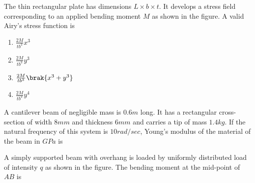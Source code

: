 \item The thin rectangular plate has dimensions $L\times b\times t.$ It develops a stress field corresponding to an applied bending moment $M$ as shown in the figure. A valid Airy's stress function is\\\begin{center}
\end{center}
\begin{enumerate}
	\item $\frac{2M}{tb^3}x^3$
	\item $\frac{2M}{tb^3}y^3$
	\item $\frac{2M}{tb^3}\brak{x^3+y^3}$
	\item $\frac{2M}{tb^3}y^4$
\end{enumerate}
\item A cantilever beam of negligible mass is $0.6 m$ long. It has a rectangular cross-section of width $8 mm$ and thickness $6 mm$ and carries a tip of mass $1.4 kg$. If the natural frequency of this system is $10 rad/sec$, Young's modulus of the material of the beam in $GPa$ is \underline{\hspace{2cm}} \\
\item A simply supported beam with overhang is loaded by uniformly distributed load of intensity $q$ as shown in the figure. The bending moment at the mid-point of $AB$ is
